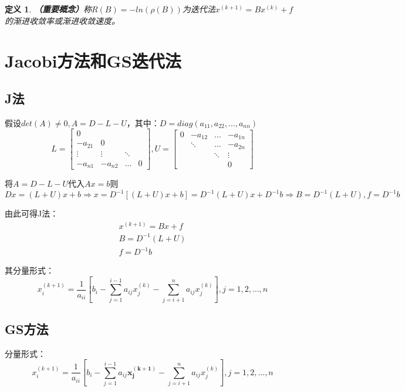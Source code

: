 \documentclass[a4paper]{article}
\newtheorem{definition}{定义}[section]
\begin{document}
\begin{definition}
  \textbf{（重要概念）}称$R(B)=-ln(\rho(B)) $为迭代法$x^{(k+1)}=Bx^{(k)}+f $的渐进收敛率或渐进收敛速度。
\end{definition}

\section{Jacobi方法和GS迭代法}
\subsection{J法}
假设$det(A)\neq 0,A=D-L-U$，其中：$D=diag(a_{11}, a_{22}, \dots, a_{nn})$
$$L=\left[
  \begin{matrix}
    0 \\
    -a_{21} & 0 \\
    \vdots & \vdots & \ddots \\
    -a_{n1} & -a_{n2} & \dots & 0
  \end{matrix}
  \right],
  U=\left[\begin{matrix}
    0 & -a_{12} & \dots & -a_{1n} \\
      &  \ddots & \dots & -a_{2n} \\
      & & \ddots & \vdots \\
      & & & 0
  \end{matrix}
    \right]
  $$

将$A=D-L-U$代入$Ax=b$则$Dx=(L+U)x+b\Rightarrow x=D^{-1}[(L+U)x+b]=D^{-1}(L+U)x+D^{-1}b \Rightarrow B=D^{-1}(L+U), f=D^{-1}b $

由此可得J法：
\begin{equation}
  \begin{array}{lr}
    x^{(k+1)} = Bx+f \\
    B = D^{-1}(L+U) \\
    f = D^{-1}b
  \end{array}
\end{equation}

其分量形式：
\begin{equation}
  x_i^{(k+1)} = \frac{1}{a_{ii}}[b_i-\sum_{j=1}^{i-1}a_{ij}x_j^{(k)}-\sum^n_{j=i+1}a_{ij}x^{(k)}_j],j=1,2,\dots, n
\end{equation}

\subsection{GS方法}
分量形式：
\begin{equation}
  x_i^{(k+1)} = \frac{1}{a_{ii}}[b_i-\sum_{j=1}^{i-1}a_{ij}\mathbf{x_j^{(k+1)}}-\sum^n_{j=i+1}a_{ij}x^{(k)}_j],j=1,2,\dots, n
\end{equation}
\end{document}
